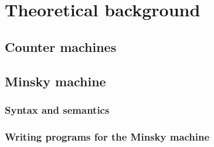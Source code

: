 \chapter{Theoretical background}
\section{Counter machines}
\section{Minsky machine}
\subsection{Syntax and semantics}
\subsection{Writing programs for the Minsky machine}
